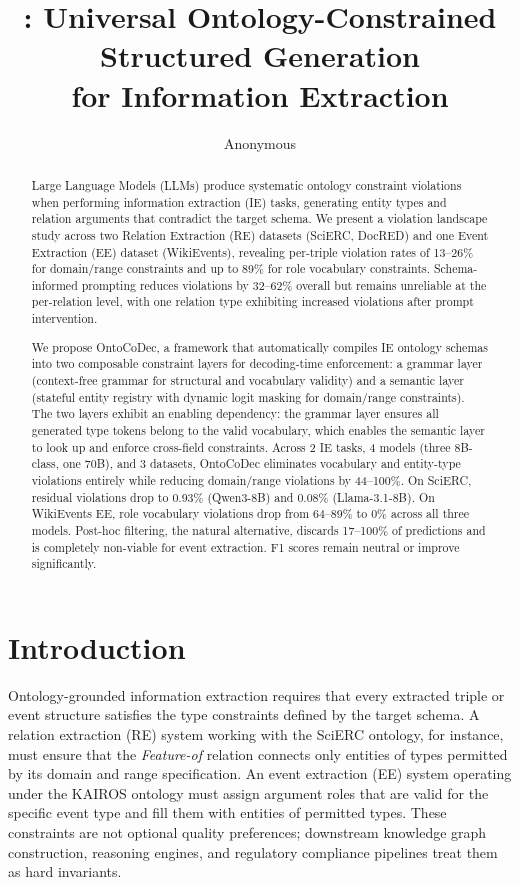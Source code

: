\documentclass[11pt,a4paper]{article}
\title{\ours{}: Universal Ontology-Constrained Structured Generation\\for Information Extraction}
\author{Anonymous}
\date{}
\newcommand{\ours}{OntoCoDec}
\begin{document}
\maketitle

\begin{abstract}
Large Language Models (LLMs) produce systematic ontology constraint violations when performing information extraction (IE) tasks, generating entity types and relation arguments that contradict the target schema. We present a violation landscape study across two Relation Extraction (RE) datasets (SciERC, DocRED) and one Event Extraction (EE) dataset (WikiEvents), revealing per-triple violation rates of 13--26\% for domain/range constraints and up to 89\% for role vocabulary constraints. Schema-informed prompting reduces violations by 32--62\% overall but remains unreliable at the per-relation level, with one relation type exhibiting increased violations after prompt intervention.

We propose \ours{}, a framework that automatically compiles IE ontology schemas into two composable constraint layers for decoding-time enforcement: a grammar layer (context-free grammar for structural and vocabulary validity) and a semantic layer (stateful entity registry with dynamic logit masking for domain/range constraints). The two layers exhibit an enabling dependency: the grammar layer ensures all generated type tokens belong to the valid vocabulary, which enables the semantic layer to look up and enforce cross-field constraints. Across 2 IE tasks, 4 models (three 8B-class, one 70B), and 3 datasets, \ours{} eliminates vocabulary and entity-type violations entirely while reducing domain/range violations by 44--100\%. On SciERC, residual violations drop to 0.93\% (Qwen3-8B) and 0.08\% (Llama-3.1-8B). On WikiEvents EE, role vocabulary violations drop from 64--89\% to 0\% across all three models. Post-hoc filtering, the natural alternative, discards 17--100\% of predictions and is completely non-viable for event extraction. F1 scores remain neutral or improve significantly.
\end{abstract}

\section{Introduction}

Ontology-grounded information extraction requires that every extracted triple or event structure satisfies the type constraints defined by the target schema. A relation extraction (RE) system working with the SciERC ontology, for instance, must ensure that the \textit{Feature-of} relation connects only entities of types permitted by its domain and range specification. An event extraction (EE) system operating under the KAIROS ontology must assign argument roles that are valid for the specific event type and fill them with entities of permitted types. These constraints are not optional quality preferences; downstream knowledge graph construction, reasoning engines, and regulatory compliance pipelines treat them as hard invariants.
\end{document}
